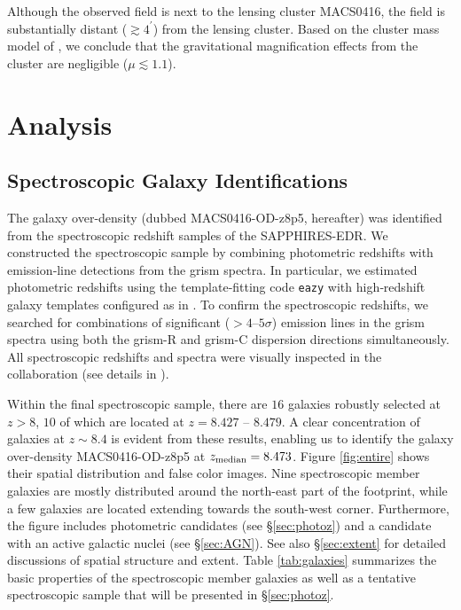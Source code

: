 \documentclass[twocolumn]{aastex631}
\begin{document}
Although the observed field is next to the lensing cluster MACS0416, the field is substantially distant ($\gtrsim4^{\prime}$) from the lensing cluster.
Based on the cluster mass model of \citet{richard_2021}, we conclude that the gravitational magnification effects from the cluster are negligible ($\mu\lesssim1.1$).
 
\section{Analysis} \label{sec:analysis}

\subsection{Spectroscopic Galaxy Identifications}
The galaxy over-density (dubbed MACS0416-OD-z8p5, hereafter) was identified from the spectroscopic redshift samples of the SAPPHIRES-EDR.
We constructed the spectroscopic sample by combining photometric redshifts with emission‑line detections from the grism spectra.
In particular, we estimated photometric redshifts using the template‑fitting code \texttt{eazy} \citep{Brammer2008} with high‑redshift galaxy templates configured as in \citet{Hainline2024}.
To confirm the spectroscopic redshifts, we searched for combinations of significant ($>4$--$5\sigma$) emission lines in the grism spectra using both the grism-R and grism-C dispersion directions simultaneously.
All spectroscopic redshifts and spectra were visually inspected in the collaboration (see details in \citealt{Sun2025}). 

Within the final spectroscopic sample, there are $16$ galaxies robustly selected at $z>8$, $10$ of which are located at $z=8.427$ -- $8.479$. A clear concentration of galaxies at $z\sim8.4$ is evident from these results, enabling us to identify the galaxy over-density MACS0416-OD-z8p5 at $z_{\rm median}=8.473$.
Figure \ref{fig:entire} shows their spatial distribution and false color images. Nine spectroscopic member galaxies are mostly distributed around the north-east part of the footprint, while a few galaxies are located extending towards the south-west corner. Furthermore, the figure includes photometric candidates (see \S\ref{sec:photoz}) and a candidate with an active galactic nuclei (see \S\ref{sec:AGN}). See also \S\ref{sec:extent} for detailed discussions of spatial structure and extent.
Table \ref{tab:galaxies} summarizes the basic properties of the spectroscopic member galaxies as well as a tentative spectroscopic sample that will be presented in \S\ref{sec:photoz}.
\end{document}

